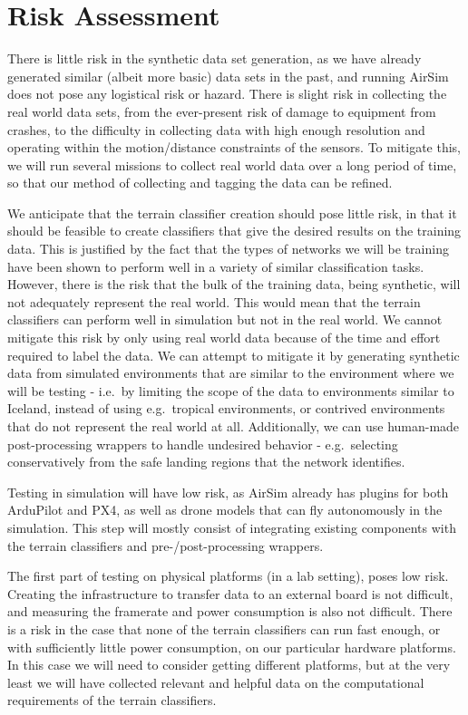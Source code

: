 \section{Risk Assessment}
\label{section:risk_assessment}

There is little risk in the synthetic data set generation, as we have already generated similar
(albeit more basic) data sets in the past, and running AirSim does not pose any logistical risk or hazard.
There is slight risk in collecting the real world data sets, from the ever-present risk of damage
to equipment from crashes, to the difficulty in collecting data with high enough resolution and
operating within the motion/distance constraints of the sensors.
To mitigate this, we will run several missions to collect real world data over a long period of time,
so that our method of collecting and tagging the data can be refined.

We anticipate that the terrain classifier creation should pose little risk, in that it should be
feasible to create classifiers that give the desired results on the training data.
This is justified by the fact that the types of networks we will be training have been shown to
perform well in a variety of similar classification tasks.
However, there is the risk that the bulk of the training data, being synthetic, will not adequately
represent the real world.
This would mean that the terrain classifiers can perform well in simulation
but not in the real world.
We cannot mitigate this risk by only using real world data because of the time and effort
required to label the data.
We can attempt to mitigate it by generating synthetic data from simulated environments that are
similar to the environment where we will be testing - i.e.~by limiting the scope of the data
to environments similar to Iceland, instead of using e.g.~tropical environments,
or contrived environments that do not represent the real world at all.
Additionally, we can use human-made post-processing wrappers to handle undesired behavior -
e.g.~selecting conservatively from the safe landing regions that the network identifies.

Testing in simulation will have low risk, as AirSim already has plugins for both ArduPilot and PX4,
as well as drone models that can fly autonomously in the simulation.
This step will mostly consist of integrating existing components with the terrain classifiers and
pre-/post-processing wrappers.

The first part of testing on physical platforms (in a lab setting), poses low risk.
Creating the infrastructure to transfer data to an external board is not difficult,
and measuring the framerate and power consumption is also not difficult.
There is a risk in the case that none of the terrain classifiers can run fast enough,
or with sufficiently little power consumption, on our particular hardware platforms.
In this case we will need to consider getting different platforms, but at the very least we will
have collected relevant and helpful data on the computational requirements of the terrain classifiers.

